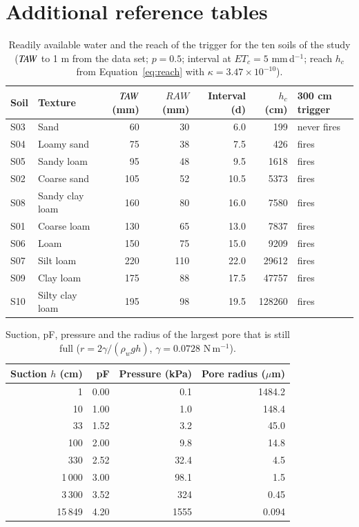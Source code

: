 \section{Additional reference tables}\label{sec:ws-ref}
\begin{table}[!htbp]\centering\small\caption{Readily available water and the reach of the trigger for the ten soils of the study ($\mathit{TAW}$ to 1 m from the data set; $p=0.5$; interval at $ET_c=5$ mm\,d$^{-1}$; reach $h_c$ from Equation~\ref{eq:reach} with $\kappa=3.47\times10^{-10}$).}\label{tab:ws-raw}
\begin{tabular}{llrrrrl}\toprule
Soil & Texture & $\mathit{TAW}$ (mm) & $RAW$ (mm) & Interval (d) & $h_c$ (cm) & 300 cm trigger\\\midrule
S03 & Sand & 60 & 30 & 6.0 & 199 & never fires \\
S04 & Loamy sand & 75 & 38 & 7.5 & 426 & fires \\
S05 & Sandy loam & 95 & 48 & 9.5 & 1618 & fires \\
S02 & Coarse sand & 105 & 52 & 10.5 & 5373 & fires \\
S08 & Sandy clay loam & 160 & 80 & 16.0 & 7580 & fires \\
S01 & Coarse loam & 130 & 65 & 13.0 & 7837 & fires \\
S06 & Loam & 150 & 75 & 15.0 & 9209 & fires \\
S07 & Silt loam & 220 & 110 & 22.0 & 29612 & fires \\
S09 & Clay loam & 175 & 88 & 17.5 & 47757 & fires \\
S10 & Silty clay loam & 195 & 98 & 19.5 & 128260 & fires \\
\bottomrule\end{tabular}\end{table}
\begin{table}[!htbp]\centering\small\caption{Suction, pF, pressure and the radius of the largest pore that is still full ($r=2\gamma/(\rho_wgh)$, $\gamma=0.0728$ N\,m$^{-1}$).}\label{tab:ws-pf}
\begin{tabular}{rrrr}\toprule
Suction $h$ (cm) & pF & Pressure (kPa) & Pore radius ($\mu$m)\\\midrule
1 & 0.00 & 0.1 & 1484.2 \\
10 & 1.00 & 1.0 & 148.4 \\
33 & 1.52 & 3.2 & 45.0 \\
100 & 2.00 & 9.8 & 14.8 \\
330 & 2.52 & 32.4 & 4.5 \\
1\,000 & 3.00 & 98.1 & 1.5 \\
3\,300 & 3.52 & 324 & 0.45 \\
15\,849 & 4.20 & 1555 & 0.094 \\
\bottomrule\end{tabular}\end{table}

